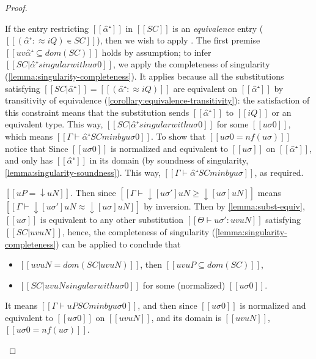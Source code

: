 \begin{proof}
\begin{caseof}
            If the entry restricting $[[α̂⁺]]$ in $[[SC]]$ is an \emph{equivalence} entry
            ($[[(α̂⁺ :≈ iQ) ∊ SC]]$), then we wish to apply
            .
            The first premise $[[uv α̂⁺ ⊆ dom(SC)]]$  
            holds by assumption;
            to infer $[[SC|{α̂⁺} singular with uσ0]]$, 
            we apply the completeness of singularity (\cref{lemma:singularity-completeness}).
            It applies because all the substitutions satisfying $[[SC|{α̂⁺}]] = [[(α̂⁺ :≈ iQ)]]$
            are equivalent on $[[{α̂⁺}]]$ by transitivity of equivalence 
            (\cref{corollary:equivalence-transitivity}): 
            the satisfaction of this constraint means that the substitution 
            sends $[[α̂⁺]]$ to $[[iQ]]$ or an equivalent type.
            This way, $[[SC|{α̂⁺} singular with uσ0]]$ for some $[[uσ0]]$,
            which means $[[Γ ⊢ α̂⁺ SC minby uσ0]]$.
            To show that $[[uσ0 = nf(uσ)]]$ notice that 
            Since $[[uσ0]]$ is normalized and equivalent to $[[uσ]]$ on $[[{α̂⁺}]]$, 
            and only has $[[α̂⁺]]$ in its domain
            (by soundness of singularity, \cref{lemma:singularity-soundness}).
            This way, $[[Γ ⊢ α̂⁺ SC minby uσ]]$, as required.
        \item  \label{case:min-inst-completeness-down}
            $[[uP = ↓uN]]$. Then since
            $[[Γ ⊢ ↓[uσ']uN ≥ ↓[uσ]uN ]]$ means
            $[[Γ ⊢ ↓[uσ']uN ≈ ↓[uσ]uN ]]$ by inversion.
            Then by \cref{lemma:subst-equiv}, 
            $[[uσ]]$ is equivalent to any other substitution 
            $[[Θ ⊢ uσ' : uv uN ]]$ satisfying $[[SC|uv uN]]$,
            hence, the completeness of singularity (\cref{lemma:singularity-completeness})
            can be applied to conclude that
            \begin{itemize}
                \item $[[uv uN = dom(SC|uv uN)]]$, then $[[uv uP ⊆ dom(SC)]]$,
                \item $[[SC|uv uN singular with uσ0]]$ for some (normalized) $[[uσ0]]$.
            \end{itemize}
            It means $[[Γ ⊢ uP SC minby uσ0 ]]$, and then
            since $[[uσ0]]$ is normalized and equivalent to $[[uσ0]]$ on $[[uv uN]]$,
            and its domain is $[[uv uN]]$, $[[uσ0 = nf(uσ)]]$.

\end{caseof}
\end{proof}
